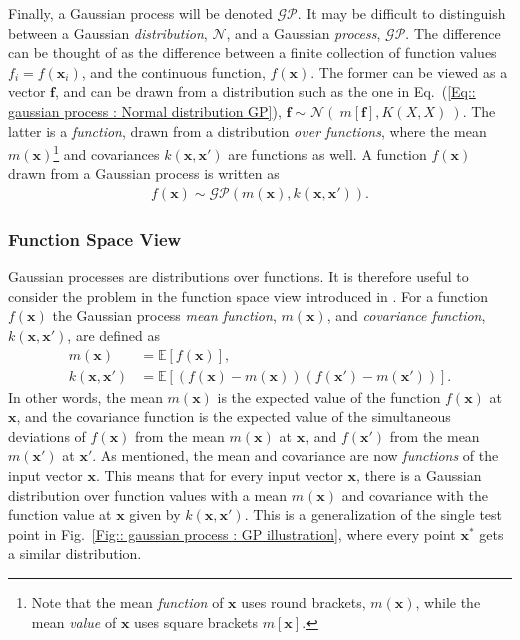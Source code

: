 \documentclass[twoside,english]{uiofysmaster}
\begin{document}
{{Finally, a Gaussian process will be denoted $\mathcal{GP}$. It may be difficult to distinguish between a Gaussian \textit{distribution}, $\mathcal{N}$, and a Gaussian \textit{process}, $\mathcal{GP}$. The difference can be thought of as the difference between a finite collection of function values $f_i = f(\textbf{x}_i)$, and the continuous function, $f(\textbf{x})$. The former can be viewed as a vector $\textbf{f}$, and can be drawn from a distribution such as the one in Eq.~(\ref{Eq:: gaussian process : Normal distribution GP}), $\textbf{f} \sim \mathcal{N}(~m[\textbf{f} ], K(X, X)~)$. The latter is a \textit{function}, drawn from a distribution \textit{over functions}, where the mean $m(\textbf{x})$\footnote{Note that the mean \textit{function} of $\textbf{x}$ uses round brackets, $m(\textbf{x})$, while the mean \textit{value} of $\textbf{x}$ uses square brackets $m[\textbf{x}]$.} and covariances $k(\textbf{x}, \textbf{x}')$ are functions as well. A function $f(\textbf{x})$ drawn from a Gaussian process is written as 
\begin{align}
f(\textbf{x}) \sim \mathcal{GP} (m(\textbf{x}), k(\textbf{x}, \textbf{x}')).
\end{align}

\subsubsection{Function Space View}

Gaussian processes are distributions over functions. It is therefore useful to consider the problem in the function space view introduced in \cite{rasmussen2006gaussian}. For a function $f(\textbf{x})$ the Gaussian process \textit{mean function}, $m(\textbf{x})$, and \textit{covariance function}, $k(\textbf{x}, \textbf{x}')$, are defined as
\begin{align}
m(\textbf{x}) &= \mathbb{E}[f(\textbf{x})],\\
k(\textbf{x}, \textbf{x}') &= \mathbb{E} [(f(\textbf{x}) - m(\textbf{x}))(f(\textbf{x}') - m(\textbf{x}'))].
\end{align}
In other words, the mean $m(\textbf{x})$ is the expected value of the function $f(\textbf{x})$ at $\textbf{x}$, and the covariance function is the expected value of the simultaneous deviations of $f(\textbf{x})$ from the mean $m(\textbf{x})$ at $\textbf{x}$, and $f(\textbf{x}')$ from the mean $m(\textbf{x}')$ at $\textbf{x}'$. As mentioned, the mean and covariance are now \textit{functions} of the input vector $\textbf{x}$. This means that for every input vector $\textbf{x}$, there is a Gaussian distribution over function values with a mean $m(\textbf{x})$ and covariance with the function value at $\textbf{x}$ given by $k(\textbf{x}, \textbf{x}')$. This is a generalization of the single test point in Fig.~\ref{Fig:: gaussian process : GP illustration}, where every point $\textbf{x}^*$ gets a similar distribution.

}}
\end{document}

